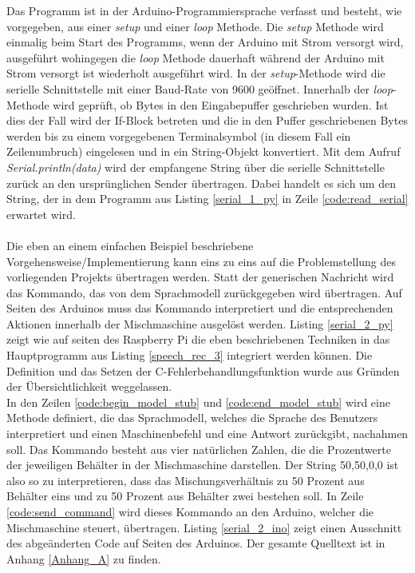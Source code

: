 
Das Programm ist in der Arduino-Programmiersprache verfasst und besteht, wie vorgegeben, aus einer \textit{setup} und einer \textit{loop} Methode. Die \textit{setup} Methode wird einmalig beim Start des Programms, wenn der Arduino mit Strom versorgt wird, ausgeführt wohingegen die \textit{loop} Methode dauerhaft während der Arduino mit Strom versorgt ist wiederholt ausgeführt wird. In der \textit{setup}-Methode wird die serielle Schnittstelle mit einer Baud-Rate von 9600 geöffnet. Innerhalb der \textit{loop}-Methode wird geprüft, ob Bytes in den Eingabepuffer geschrieben wurden. Ist dies der Fall wird der If-Block betreten und die in den Puffer geschriebenen Bytes werden bis zu einem vorgegebenen Terminalsymbol (in diesem Fall ein Zeilenumbruch) eingelesen und in ein String-Objekt konvertiert. Mit dem Aufruf \textit{Serial.println(data)} wird der empfangene String über die serielle Schnittstelle zurück an den ursprünglichen Sender übertragen. Dabei handelt es sich um den String, der in dem Programm aus Listing \ref{serial_1_py} in Zeile \ref{code:read_serial} erwartet wird.\\\\
Die eben an einem einfachen Beispiel beschriebene Vorgehensweise/Implementierung kann eins zu eins auf die Problemstellung des vorliegenden Projekts übertragen werden. Statt der generischen Nachricht wird das Kommando, das von dem Sprachmodell zurückgegeben wird übertragen. Auf Seiten des Arduinos muss das Kommando interpretiert und die entsprechenden Aktionen innerhalb der Mischmaschine ausgelöst werden. Listing \ref{serial_2_py} zeigt wie auf seiten des Raspberry Pi die eben beschriebenen Techniken in das Hauptprogramm aus Listing \ref{speech_rec_3} integriert werden können. Die Definition und das Setzen der C-Fehlerbehandlungsfunktion wurde aus Gründen der Übersichtlichkeit weggelassen.\\

In den Zeilen \ref{code:begin_model_stub} und \ref{code:end_model_stub} wird eine Methode definiert, die das Sprachmodell, welches die Sprache des Benutzers interpretiert und einen Maschinenbefehl und eine Antwort zurückgibt, nachahmen soll. Das Kommando besteht aus vier natürlichen Zahlen, die die Prozentwerte der jeweiligen Behälter in der Mischmaschine darstellen. Der String \glqq{}50,50,0,0\grqq{} ist also so zu interpretieren, dass das Mischungsverhältnis zu 50 Prozent aus Behälter eins und zu 50 Prozent aus Behälter zwei bestehen soll. In Zeile \ref{code:send_command} wird dieses Kommando an den Arduino, welcher die Mischmaschine steuert, übertragen. Listing \ref{serial_2_ino} zeigt einen Ausschnitt des abgeänderten Code auf Seiten des Arduinos. Der gesamte Quelltext ist in Anhang \ref{Anhang_A} zu finden.\\
